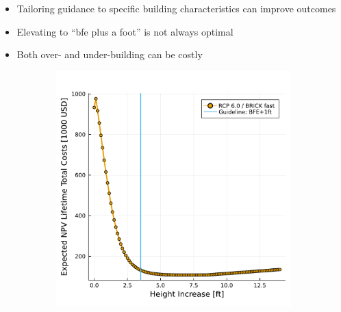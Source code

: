 \documentclass[12pt]{article}
\begin{document}
\begin{itemize}
    \item Tailoring guidance to specific building characteristics can improve outcomes
    \item Elevating to ``\acrshort{bfe} plus a foot'' is not always optimal \citep{xian_elevation:2017,zarekarizi_suboptimal:2020}
    \item Both over- and under-building can be costly \citep{ansar_bigisfragile:2017,DossGollin:2019}
\end{itemize}
\begin{figure}
    \centering
    \begin{subfigure}{0.3\textwidth}
        \includegraphics[width=\textwidth]{5.5.pdf}
    \end{subfigure}~
    \begin{subfigure}{0.3\textwidth}

\end{subfigure}
\end{figure}
\end{document}
